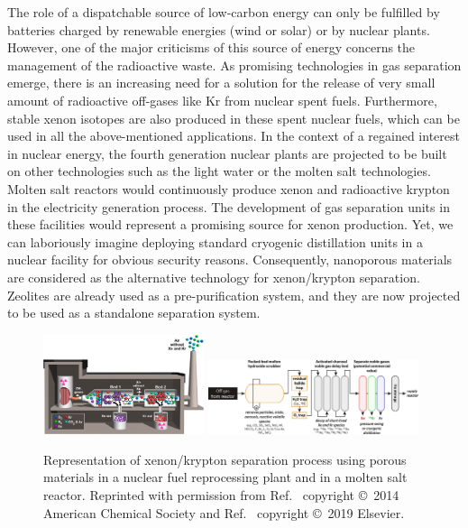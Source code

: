 \documentclass[main.tex]{subfiles}
\begin{document}
The role of a dispatchable source of low-carbon energy can only be fulfilled by batteries charged by renewable energies (wind or solar) or by nuclear plants. However, one of the major criticisms of this source of energy concerns the management of the radioactive waste. As promising technologies in gas separation emerge, there is an increasing need for a solution for the release of very small amount of radioactive off-gases like Kr from nuclear spent fuels.\autocite{Blomeke_1969} Furthermore, stable xenon isotopes are also produced in these spent nuclear fuels, which can be used in all the above-mentioned applications. In the context of a regained interest in nuclear energy, the fourth generation nuclear plants are projected to be built on other technologies such as the light water or the molten salt technologies.\autocite{LeBlanc_2010} Molten salt reactors would continuously produce xenon and radioactive krypton in the electricity generation process.\autocite{Riley_2019} The development of gas separation units in these facilities would represent a promising source for xenon production. Yet, we can laboriously imagine deploying standard cryogenic distillation units in a nuclear facility for obvious security reasons. Consequently, nanoporous materials are considered as the alternative technology for xenon/krypton separation. Zeolites are already used as a pre-purification system,\autocite{kerry2007industrial} and they are now projected to be used as a standalone separation system. 

\begin{figure}[ht]
  \includegraphics[width=0.42\textwidth]{figures/1-screening/Kr_treatment.jpg}
  \includegraphics[width=0.55\textwidth]{figures/1-screening/MSR_noble_gas.jpg}
  \caption{Representation of xenon/krypton separation process using porous materials in a nuclear fuel reprocessing plant and in a molten salt reactor. Reprinted with permission from Ref.~\cite{Banerjee_2014} copyright \copyright\ 2014 American Chemical Society and Ref.~\cite{Riley_2019} copyright \copyright\ 2019 Elsevier.}\label{fgr:industrial}
\end{figure}
\end{document}
